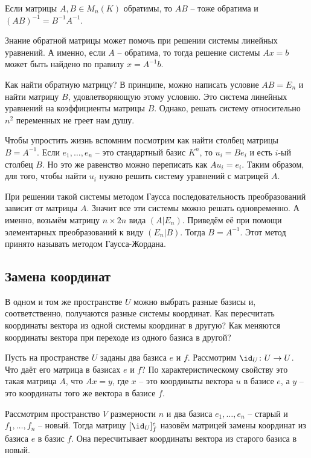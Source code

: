 \rm Если матрицы $A,B\in M_n(K)$ обратимы, то $AB$ -- тоже обратима и $(AB)^{-1}=B^{-1}A^{-1}$.
\erm

Знание обратной матрицы может помочь при решении системы линейных уравнений. А именно, если $A$ -- обратима, то тогда решение системы $Ax=b$ может быть найдено по правилу $x=A^{-1}b$.

Как найти обратную матрицу? В принципе, можно написать условие $AB=E_n$ и найти матрицу $B$, удовлетворяющую этому условию. Это система линейных уравнений на коэффициенты матрицы $B$. Однако, решать систему  относительно $n^2$ переменных не греет нам душу. 

Чтобы упростить жизнь вспомним посмотрим как найти столбец матрицы $B=A^{-1}$. Если $e_1,\dots,e_n$ -- это стандартный  базис $K^n$, то $u_i=Be_i$ и есть $i$-ый столбец $B$. Но это же равенство можно переписать как $Au_i=e_i$. Таким образом, для того, чтобы найти $u_i$ нужно решить систему уравнений с матрицей $A$. 

При решении такой системы методом Гаусса последовательность преобразований зависит от матрицы $A$. Значит все эти системы можно решать одновременно. А именно, возьмём матрицу $n\times 2n$ вида $(A|E_n)$. Приведём её при помощи элементарных преобразований к виду $(E_n|B)$. Тогда $B=A^{-1}$. Этот метод принято называть методом Гаусса-Жордана.



\subsection{Замена координат}


В одном и том же пространстве $U$ можно выбрать разные базисы и, соответственно, получаются разные системы координат. Как пересчитать координаты вектора из одной системы координат в другую?  Как меняются координаты вектора при переходе из одного базиса в другой?

Пусть на пространстве $U$ заданы два базиса $e$  и $f$. Рассмотрим $\id_U \colon U \to U$. Что даёт его матрица в базисах $e$  и $f$? По характеристическому свойству это такая матрица $A$, что $Ax=y$, где $x$ -- это координаты вектора $u$ в базисе $e$, а $y$ -- это координаты того же вектора в базисе $f$.

\dfn Рассмотрим пространство $V$ размерности $n$ и два базиса $e_1,\dots,e_n$ -- старый и $f_1,\dots,f_n$ -- новый. Тогда матрицу 
$[\id_U]^e_f$ назовём матрицей замены координат из базиса $e$ в базис $f$. Она пересчитывает координаты вектора из старого базиса в новый.

